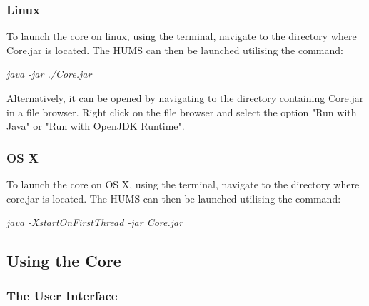 \documentclass[10pt,a4paper]{article}
\begin{document}
\subsubsection{Linux}
To launch the core on linux, using the terminal, navigate to the directory where Core.jar is located. The HUMS can then be launched utilising the command:
\begin{center}
\textit{java -jar ./Core.jar}
\end{center}
Alternatively, it can be opened by navigating to the directory containing Core.jar in a file browser. Right click on the file browser and select the option "Run with Java" or "Run with OpenJDK Runtime".

\subsubsection{OS X}
To launch the core on OS X, using the terminal, navigate to the directory where core.jar is located. The HUMS can then be launched utilising the command:
\begin{center}
\textit{java -XstartOnFirstThread -jar Core.jar}
\end{center}

\subsection{Using the Core}
\label{sec:core}

\subsubsection{The User Interface}
\end{document}
